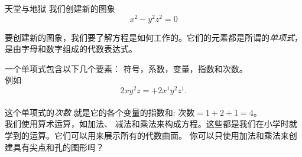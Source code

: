 ﻿\begin{surferPage}{天堂与地狱}
我们创建新的图象\\
\smallskip
\[x^2	- y^2z^2	= 0\]

\singlespacing
要创建新的图象，我们要了解方程是如何工作的。它们的元素都是所谓的\textit{单项式}，是由字母和数字组成的代数表达式。

\singlespacing
一个单项式包含以下几个要素：
符号，系数，变量，指数和次数。\\

\singlespacing
例如
\smallskip
\[2xy^2z = +2x^1y^2z^1.\]
\\
\smallskip
这个单项式的\textit{次数} 就是它的各个变量的指数和: 次数$ = 1+2+1=4$。\\

\singlespacing
我们使用算术运算，如加法、 减法和乘法来构成方程。这些都是我们在小学时就学到的运算。它们可以用来展示所有的代数曲面。
\singlespacing
你可以只使用加法和乘法来创建具有尖点和孔的图形吗？
\end{surferPage}

